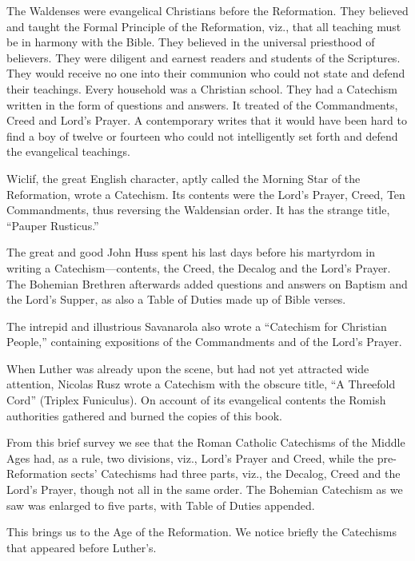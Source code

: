 The Waldenses were evangelical Christians before the Reformation. They believed and taught the Formal Principle of the Reformation, viz., that all teaching must be in harmony with the Bible. They believed in the universal priesthood of believers. They were diligent and earnest readers and students of the Scriptures. They would receive no one into their communion who could not state and defend their teachings. Every household was a Christian school. They had a Catechism written in the form of questions and answers. It treated of the Commandments, Creed and Lord’s Prayer. A contemporary writes that it would have been hard to find a boy of twelve or fourteen who could not intelligently set forth and defend the evangelical teachings.

 Wiclif, the great English character, aptly called the Morning Star of the Reformation, wrote a Catechism. Its contents were the Lord’s Prayer, Creed, Ten Commandments, thus reversing the Waldensian order. It has the strange title, “Pauper Rusticus.”


The great and good John Huss spent his last days before his martyrdom in writing a Catechism—contents, the Creed, the Decalog and the Lord’s Prayer. The Bohemian Brethren afterwards added questions
and answers on Baptism and the Lord’s Supper, as also a Table of Duties made up of Bible verses.

The intrepid and illustrious Savanarola also wrote a “Catechism for Christian People,” containing expositions of the Commandments and of the Lord’s Prayer. 


When Luther was already upon the scene, but had not yet attracted wide attention, Nicolas Rusz wrote a Catechism with the obscure title, “A Threefold Cord” (Triplex Funiculus). On account of its evangelical contents the Romish authorities gathered and burned the copies of this book. 


From this brief survey we see that the Roman Catholic Catechisms of the Middle Ages had, as a rule, two divisions, viz., Lord’s Prayer and Creed, while the pre-Reformation sects’ Catechisms had three parts, viz., the Decalog, Creed and the Lord’s Prayer, though not all in the same order. The Bohemian Catechism as we saw was enlarged to five parts, with Table of Duties appended.

This brings us to the Age of the Reformation.  We notice briefly the Catechisms that appeared before Luther’s.

